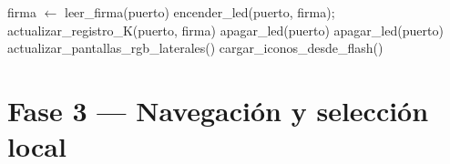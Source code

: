 \documentclass[11pt,a4paper]{article}
\begin{document}
\begin{algorithm}[H]
\caption{Fase 2 --- Gesti\'on de perif\'ericos (por cada puerto)}
\begin{algorithmic}[1]
        \State firma $\gets$ leer\_firma(puerto)
            \State encender\_led(puerto, firma); actualizar\_registro\_K(puerto, firma)
        \Else
            \State apagar\_led(puerto)
        \EndIf
    \Else
        \State apagar\_led(puerto)
    \EndIf
\EndFor
\State actualizar\_pantallas\_rgb\_laterales()
\State cargar\_iconos\_desde\_flash()  
\end{algorithmic}
\end{algorithm}

\section{Fase 3 --- Navegaci\'on y selecci\'on local}
\label{sec:fase3}
\end{document}
